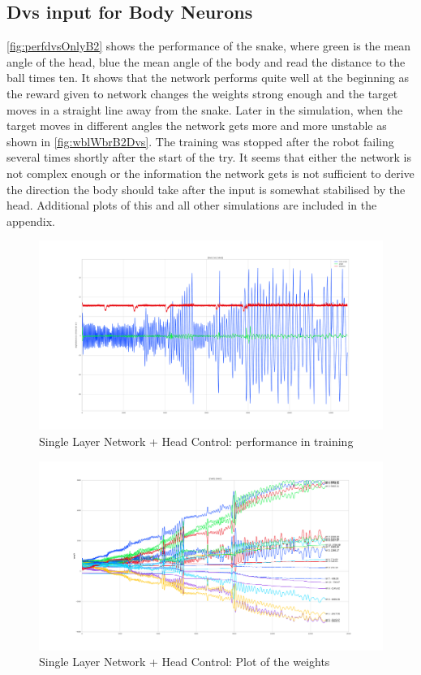 \subsection{Dvs input for Body Neurons}
\autoref{fig:perfdvsOnlyB2} shows the performance of the snake, where green is the mean angle of the head, blue the mean angle of the body and read the distance to the ball times ten. It shows that the network performs quite well at the beginning as the reward given to network changes the weights strong enough and the target moves in a straight line away from the snake. Later in the simulation, when the target moves in different angles the network gets more and more unstable as shown in \autoref{fig:wblWbrB2Dvs}. The training was stopped after the robot failing several times shortly after the start of the try. It seems that either the network is not complex enough or the information the network gets is not sufficient to derive the direction the body should take after the input is somewhat stabilised by the head. Additional plots of this and all other simulations are included in the appendix.

\begin{figure}[htpb]
  \centering
  \includegraphics[width=\textwidth]{figures/plots/perfdvsOnlyB2}
  \caption{ Single Layer Network + Head Control: performance in training }
  \label{fig:perfdvsOnlyB2}
\end{figure}
\begin{figure}[htpb]
  \centering
  \includegraphics[width=\textwidth]{figures/plots/wblWbrB2Dvs}
  \caption{ Single Layer Network + Head Control: Plot of the weights }
  \label{fig:wblWbrB2Dvs}
\end{figure}
